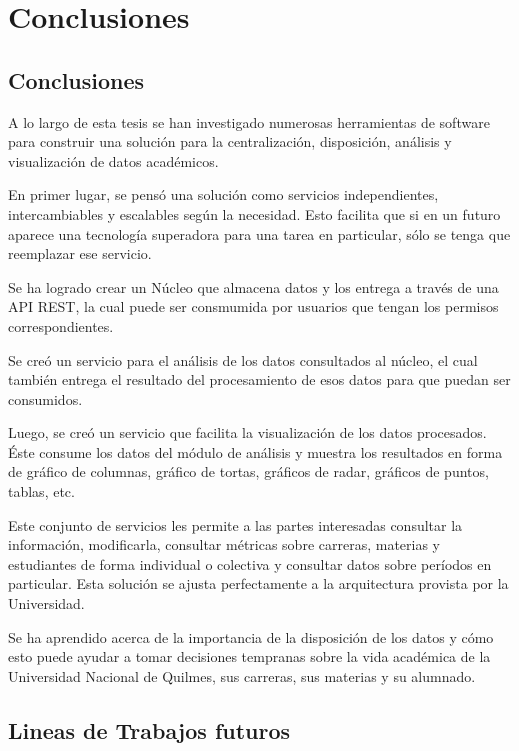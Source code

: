 \chapter{Conclusiones}
\label{sec:conclusiones}

\section[Conclusiones]{Conclusiones}

A lo largo de esta tesis se han investigado numerosas herramientas de software para construir una solución para la centralización, disposición, análisis y visualización de datos académicos.

En primer lugar, se pensó una solución como servicios independientes, intercambiables y escalables según la necesidad. Esto facilita que si en un futuro aparece una tecnología superadora para una tarea en particular, sólo se tenga que reemplazar ese servicio.

Se ha logrado crear un Núcleo que almacena datos y los entrega a través de una API REST, la cual puede ser consmumida por usuarios que tengan los permisos correspondientes.

Se creó un servicio para el análisis de los datos consultados al núcleo, el cual también entrega el resultado del procesamiento de esos datos para que puedan ser consumidos.

Luego, se creó un servicio que facilita la visualización de los datos procesados. Éste consume los datos del módulo de análisis y muestra los resultados en forma de gráfico de columnas, gráfico de tortas, gráficos de radar, gráficos de puntos, tablas, etc.

Este conjunto de servicios les permite a las partes interesadas consultar la información, modificarla, consultar métricas sobre carreras, materias y estudiantes de forma individual o colectiva y consultar datos sobre períodos en particular.
Esta solución se ajusta perfectamente a la arquitectura provista por la Universidad.

Se ha aprendido acerca de la importancia de la disposición de los datos y cómo esto puede ayudar a tomar decisiones tempranas sobre la vida académica de la Universidad Nacional de Quilmes, sus carreras, sus materias y su alumnado.


\section[Lineas de Trabajos futuros]{Lineas de Trabajos futuros}

